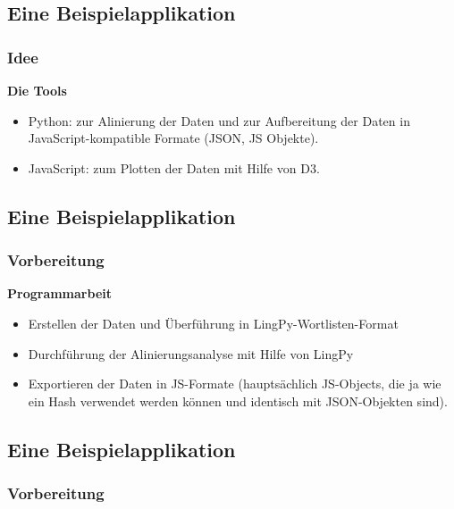 \subsection{\texorpdfstring{{Eine
Beispielapplikation}}{Eine Beispielapplikation}}

\subsubsection{\texorpdfstring{{Idee}}{Idee}}

\textbf{Die Tools}

\begin{itemize}
\itemsep1pt\parskip0pt
\item
  Python: zur Alinierung der Daten und zur Aufbereitung der Daten in
  JavaScript-kompatible Formate (JSON, JS Objekte).
\item
  JavaScript: zum Plotten der Daten mit Hilfe von D3.
\end{itemize}

\subsection{\texorpdfstring{{Eine
Beispielapplikation}}{Eine Beispielapplikation}}

\subsubsection{\texorpdfstring{{Vorbereitung}}{Vorbereitung}}

\textbf{Programmarbeit}

\begin{itemize}
\itemsep1pt\parskip0pt
\item
  Erstellen der Daten und Überführung in LingPy-Wortlisten-Format
\item
  Durchführung der Alinierungsanalyse mit Hilfe von LingPy
\item
  Exportieren der Daten in JS-Formate (hauptsächlich JS-Objects, die ja
  wie ein Hash verwendet werden können und identisch mit JSON-Objekten
  sind).
\end{itemize}

\subsection{\texorpdfstring{{Eine
Beispielapplikation}}{Eine Beispielapplikation}}

\subsubsection{\texorpdfstring{{Vorbereitung}}{Vorbereitung}}

